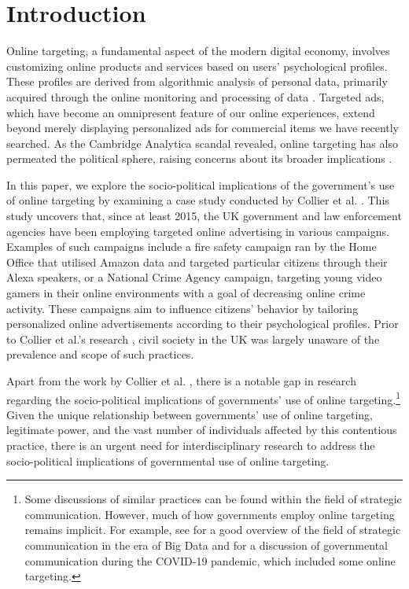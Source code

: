 \documentclass[preprint]{acmart}
\begin{document}
\section{Introduction}

Online targeting, a fundamental aspect of the modern digital economy, involves customizing online products and services based on users' psychological profiles. These profiles are derived from algorithmic analysis of personal data, primarily acquired through the online monitoring and processing of data \cite{Beer2019,Koene2015}. Targeted ads, which have become an omnipresent feature of our online experiences, extend beyond merely displaying personalized ads for commercial items we have recently searched. As the Cambridge Analytica scandal revealed, online targeting has also permeated the political sphere, raising concerns about its broader implications \cite{schneble2018}.


In this paper, we explore the socio-political implications of the government's use of online targeting by examining a case study conducted by Collier et al. \cite{Collier2022}. This study uncovers that, since at least 2015, the UK government and law enforcement agencies have been employing targeted online advertising in various campaigns. Examples of such campaigns include a fire safety campaign ran by the Home Office that utilised Amazon data and targeted particular citizens through their Alexa speakers, or a National Crime Agency campaign, targeting young video gamers in their online environments with a goal of decreasing online crime activity. These campaigns aim to influence citizens' behavior by tailoring personalized online advertisements according to their psychological profiles. Prior to Collier et al.'s research \cite{Collier2022}, civil society in the UK was largely unaware of the prevalence and scope of such practices.


Apart from the work by Collier et al. \cite{Collier2022}, there is a notable gap in research regarding the socio-political implications of governments' use of online targeting.\footnote{Some discussions of similar practices can be found within the field of strategic communication. However, much of how governments employ online targeting remains implicit. For example, see \cite{michelsen2019} for a good overview of the field of strategic communication in the era of Big Data and \cite{hyland2021} for a discussion of governmental communication during the COVID-19 pandemic, which included some online targeting.} Given the unique relationship between governments' use of online targeting, legitimate power, and the vast number of individuals affected by this contentious practice, there is an urgent need for interdisciplinary research to address the socio-political implications of governmental use of online targeting. 
\end{document}
